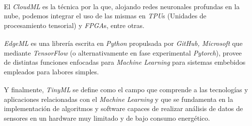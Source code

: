 El \textit{CloudML}\textsuperscript{\cite{CloudMl}} es la técnica por la que, alojando redes neuronales profundas
en la nube, podemos integrar el uso de las mismas en \textit{TPU}s (Unidades de procesamiento
tensorial) y \textit{FPGA}s, entre otras.

\textit{EdgeML}\textsuperscript{\cite{EdgeMl}} es una librería escrita en \textit{Python} propulsada por
\textit{GitHub, Microsoft} que mediante \textit{TensorFlow} (o alternativamente en
fase experimental \textit{Pytorch}), provee de distintas funciones enfocadas para
\textit{Machine Learning} para sistemas embebidos empleados para labores simples.

Y finalmente, \textit{TinyML}\textsuperscript{\cite{tinyMl}} se define como el
campo que comprende a las tecnologías y aplicaciones relacionadas con el
\textit{Machine Learning} y que se fundamenta en la implementación de algoritmos
y software capaces de realizar análisis de datos de sensores en un hardware
muy limitado y de bajo consumo energético.

